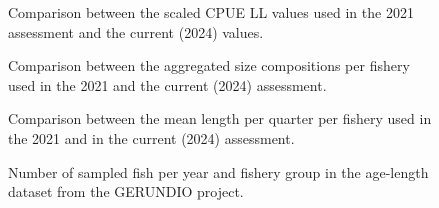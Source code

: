 \documentclass[
]{scrartcl}
\begin{document}
\newpage{}

\begin{figure}


\caption{\label{fig-comp-cpue}Comparison between the scaled CPUE LL
values used in the 2021 assessment and the current (2024) values.}

\end{figure}%

\newpage{}

\begin{figure}


\caption{\label{fig-comp-agg-size}Comparison between the aggregated size
compositions per fishery used in the 2021 and the current (2024)
assessment.}

\end{figure}%

\newpage{}

\begin{figure}


\caption{\label{fig-comp-mlen}Comparison between the mean length per
quarter per fishery used in the 2021 and in the current (2024)
assessment.}

\end{figure}%

\newpage{}

\begin{figure}


\caption{\label{fig-caal-nsamp}Number of sampled fish per year and
fishery group in the age-length dataset from the GERUNDIO project.}

\end{figure}%
\end{document}
